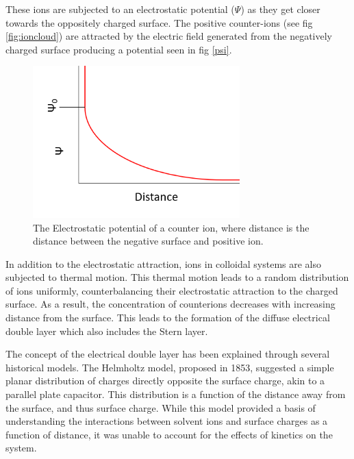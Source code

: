 These ions are subjected to an electrostatic potential ($\Psi$) as they get closer towards the oppositely charged surface. The positive counter-ions (see fig \ref{fig:ioncloud}) are attracted by the electric field generated from the negatively charged surface producing a potential seen in fig \ref{psi}. 

\begin{figure}[h]    
        \begin{center}
          \includegraphics[width=80mm]{chapter1/psi.PNG}
\end{center}
\caption{The Electrostatic potential of a counter ion, where distance is the distance between the negative surface and positive ion.}
\label{fig:psi}                
\end{figure}


In addition to the electrostatic attraction, ions in colloidal systems are also subjected to thermal motion. This thermal motion leads to a random distribution of ions uniformly, counterbalancing their electrostatic attraction to the charged surface. As a result, the concentration of counterions decreases with increasing distance from the surface. This leads to the formation of the diffuse electrical double layer which also includes the Stern layer. 

The concept of the electrical double layer has been explained through several historical models. The Helmholtz model, proposed in 1853, suggested a simple planar distribution of charges directly opposite the surface charge, akin to a parallel plate capacitor. This distribution is a function of the distance away from the surface, and thus surface charge. While this model provided a basis of understanding the interactions between solvent ions and surface charges as a function of distance, it was unable to account for the effects of kinetics on the system.

